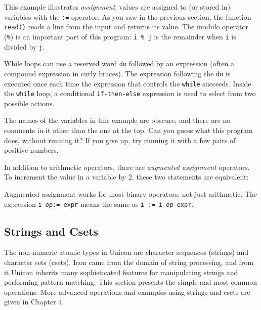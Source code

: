 This example illustrates \textit{assignment}; values
are assigned to (or {\textquotedbl}stored in{\textquotedbl}) variables
with the \texttt{:=} operator. As you saw in the previous section, the
function \texttt{read()} reads a line from the input and returns its
value. The modulo operator (\texttt{\%}) is an important part of this
program: \texttt{i \% j} is the remainder when
\texttt{i} is divided by \texttt{j}.

While loops can use a reserved word
\texttt{do} followed by an expression (often a compound expression
in curly braces). The expression following the \texttt{do} is
executed once each time the expression that controls the \texttt{while}
succeeds. Inside the \texttt{while} loop, a
conditional
\texttt{if-then-else} expression is used to select
from two possible actions.

The names of the variables in this example are obscure, and there are no
comments in it other than the one at the top. Can you guess what this
program does, without running it? If you give up, try running it with a
few pairs of positive numbers.

In addition to arithmetic operators, there are \textit{augmented assignment} operators. To
increment the value in a variable by 2, these two statements are
equivalent:


Augmented assignment works for most binary
operators, not just arithmetic. The expression \texttt{i
}\texttt{\textit{op}}\texttt{:= expr} means the same as \texttt{i := i
}\texttt{\textit{op}}\texttt{ expr}.

\subsection{Strings and Csets}

The non-numeric atomic types in Unicon are character sequences
(strings) and character sets
(csets). Icon came from the domain of string
processing, and from it Unicon inherits many sophisticated features for
manipulating strings and performing pattern
matching. This section presents the simple and most common operations.
More advanced operations and examples using strings and csets are given
in Chapter 4.

